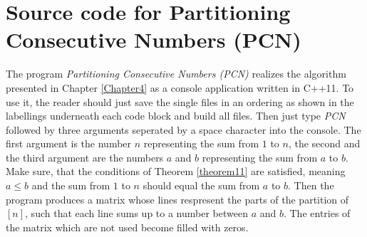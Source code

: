 \chapter{Source code for Partitioning Consecutive Numbers (PCN)}

\label{AppendixB}

The program \textit{Partitioning Consecutive Numbers (PCN)} realizes the algorithm presented in Chapter \ref{Chapter4} as a console application written in C++11. To use it, the reader should just save the single files in an ordering as shown in the labellings underneath each code block and build all files. Then just type \textit{PCN} followed by three arguments seperated by a space character into the console. The first argument is the number \(n\) representing the sum from \(1\) to \(n\), the second and the third argument are the numbers \(a\) and \(b\) representing the sum from \(a\) to \(b\). Make sure, that the conditions of Theorem \ref{theorem11} are satisfied, meaning \(a\leq b\) and the sum from \(1\) to \(n\) should equal the sum from \(a\) to \(b\). Then the program produces a matrix whose lines respresent the parts of the partition of \([n]\), such that each line sums up to a number between \(a\) and \(b\). The entries of the matrix which are not used become filled with zeros.\\
\\













